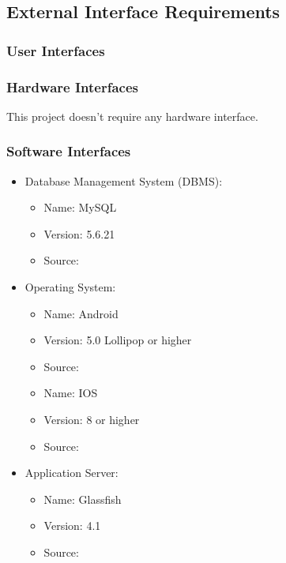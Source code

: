 \subsection{External Interface Requirements}
\subsubsection{User Interfaces}


\clearpage
\subsubsection{Hardware Interfaces}
This project doesn't require any hardware interface.

\subsubsection{Software Interfaces}
\renewcommand{\labelitemi}{$\bullet$}
\begin{itemize}
\item Database Management System (DBMS):
	\begin{itemize}
	\item Name: MySQL
	\item Version: 5.6.21
	\item Source: {\href{https://www.mysql.com}		{\color{Black}{https://www.mysql.com}}}
	\end{itemize}
\item Operating System:
	\begin{itemize}
	\item Name: Android
	\item Version: 5.0 Lollipop or higher
	\item Source: {\href{https://www.android.com/}		{\color{Black}{https://www.android.com/}}}
	\end{itemize}
	\begin{itemize}
	\item Name: IOS
	\item Version: 8 or higher
	\item Source: {\href{https://www.apple.com/ios}		{\color{Black}{https://www.apple.com/ios}}}
	\end{itemize} 
\item Application Server:
	\begin{itemize}
	\item Name: Glassfish
	\item Version: 4.1
	\item Source: {\href{https://javaee.github.io/glassfish/}		{\color{Black}{https://javaee.github.io/glassfish/}}}
	\end{itemize}
	
\end{itemize}


